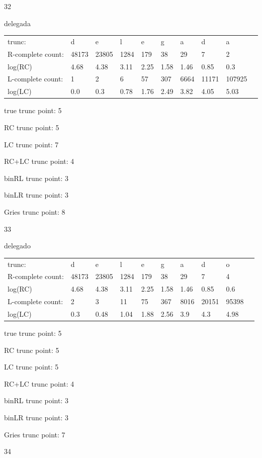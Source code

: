 \documentclass[10pt]{article}
\begin{document}
32

delegada

\begin{tabular}{l|lllllllll}
trunc: & d & e & l & e & g & a & d & a & \\ 
R-complete count: & 48173 & 23805 & 1284 & 179 & 38 & 29 & 7 & 2 & \\ 
log(RC) & 4.68 & 4.38 & 3.11 & 2.25 & 1.58 & 1.46 & 0.85 & 0.3 & \\ 
L-complete count: & 1 & 2 & 6 & 57 & 307 & 6664 & 11171 & 107925 & \\ 
log(LC) & 0.0 & 0.3 & 0.78 & 1.76 & 2.49 & 3.82 & 4.05 & 5.03 & \\ 
\end{tabular}

true trunc point: 5

RC trunc point: 5

LC trunc point: 7

RC+LC trunc point: 4

binRL trunc point: 3

binLR trunc point: 3

Gries trunc point: 8

\newpage

33

delegado

\begin{tabular}{l|lllllllll}
trunc: & d & e & l & e & g & a & d & o & \\ 
R-complete count: & 48173 & 23805 & 1284 & 179 & 38 & 29 & 7 & 4 & \\ 
log(RC) & 4.68 & 4.38 & 3.11 & 2.25 & 1.58 & 1.46 & 0.85 & 0.6 & \\ 
L-complete count: & 2 & 3 & 11 & 75 & 367 & 8016 & 20151 & 95398 & \\ 
log(LC) & 0.3 & 0.48 & 1.04 & 1.88 & 2.56 & 3.9 & 4.3 & 4.98 & \\ 
\end{tabular}

true trunc point: 5

RC trunc point: 5

LC trunc point: 5

RC+LC trunc point: 4

binRL trunc point: 3

binLR trunc point: 3

Gries trunc point: 7

\vspace{1em}

34
\end{document}
